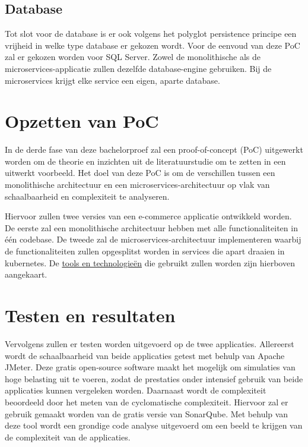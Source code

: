 \subsection{Database}

Tot slot voor de database is er ook volgens het polyglot persistence principe een vrijheid in welke type database er gekozen wordt. Voor de eenvoud van deze PoC zal er gekozen worden voor SQL Server. Zowel de monolithische als de microservices-applicatie zullen dezelfde database-engine gebruiken. Bij de microservices krijgt elke service een eigen, aparte database.

\section{Opzetten van PoC}
\label{opzetten_poc}

In de derde fase van deze bachelorproef zal een proof-of-concept (PoC) uitgewerkt worden om de theorie en inzichten uit de literatuurstudie om te zetten in een uitwerkt voorbeeld. Het doel van deze PoC is om de verschillen tussen een monolithische architectuur en een microservices-architectuur op vlak van schaalbaarheid en complexiteit te analyseren.

Hiervoor zullen twee versies van een e-commerce applicatie ontwikkeld worden. De eerste zal een monolithische architectuur hebben met alle functionaliteiten in één codebase. De tweede zal de microservices-architectuur implementeren waarbij de functionaliteiten zullen opgesplitst worden in services die apart draaien in kubernetes. De \hyperref[tools_en_technologieën]{tools en technologieën} die gebruikt zullen worden zijn hierboven aangekaart.

\section{Testen en resultaten}

Vervolgens zullen er testen worden uitgevoerd op de twee applicaties. Allereerst wordt de schaalbaarheid van beide applicaties getest met behulp van Apache JMeter. Deze gratis open-source software maakt het mogelijk om simulaties van hoge belasting uit te voeren, zodat de prestaties onder intensief gebruik van beide applicaties kunnen vergeleken worden. Daarnaast wordt de complexiteit beoordeeld door het meten van de cyclomatische complexiteit. Hiervoor zal er gebruik gemaakt worden van de gratis versie van SonarQube. Met behulp van deze tool wordt een grondige code analyse uitgevoerd om een beeld te krijgen van de complexiteit van de applicaties.

